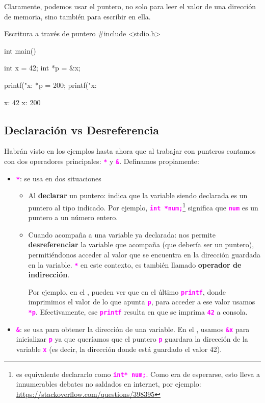 \documentclass[]{scrartcl}
\newcommand{\hl}[1]{\textcolor{magenta}{\textbf{\texttt{#1}}}}
\begin{document}
Claramente, podemos usar el puntero, no solo para leer el valor de una dirección de memoria, sino también para escribir en ella.

\begin{cbox}[]{Escritura a través de puntero}
  #include <stdio.h>

  int main(){
      int x = 42;
      int *p = &x;
  
      printf("x: %
      *p = 200;
      printf("x: %
  }
\end{cbox}

\begin{bashbox}
x: 42
x: 200
\end{bashbox}

\subsection*{Declaración vs Desreferencia} 
\label{sec:operadores}

Habrán visto en los ejemplos hasta ahora que al trabajar con punteros contamos con dos operadores principales: \hl{*} y \hl{\&}.
Definamos propiamente:

\begin{itemize}
  \item \hl{*}: se usa en dos situaciones
  \begin{itemize}
    \item Al \textbf{declarar} un puntero: indica que la variable siendo declarada es un puntero al tipo indicado.
    Por ejemplo, \hl{int *num;}\footnote{es equivalente declararlo como \hl{int* num;}. Como era de esperarse, esto lleva a innumerables debates no saldados en internet, por ejemplo: \url{https://stackoverflow.com/questions/398395}} significa que \hl{num} es un puntero a un número entero.
    \item Cuando acompaña a una variable ya declarada: nos permite \textbf{desreferenciar} la variable que acompaña (que debería ser un puntero), permitiéndonos acceder al valor que se encuentra en la dirección guardada en la variable. \hl{*} en este contexto, es también llamado \textbf{operador de indirección}.
    
    Por ejemplo, en el , pueden ver que en el último \hl{printf}, donde imprimimos el valor de lo que apunta \hl{p}, para acceder a ese valor usamos \hl{*p}. 
    Efectivamente, ese \hl{printf} resulta en que se imprima \hl{42} a consola.
  \end{itemize}
  \item \hl{\&}: se usa para obtener la dirección de una variable.
  En el , usamos \hl{\&x} para inicializar \hl{p} ya que queríamos que el puntero \hl{p} guardara la dirección de la variable \hl{x} (es decir, la dirección donde está guardado el valor 42). 
\end{itemize}
\end{document}
